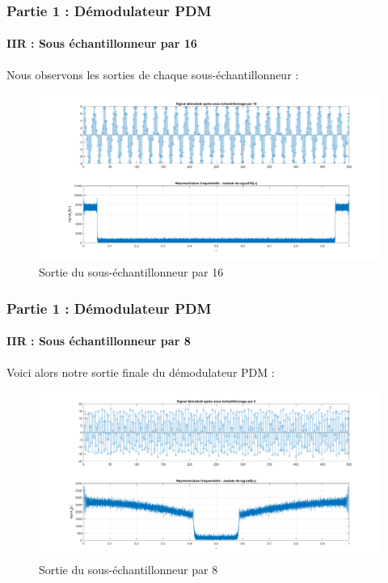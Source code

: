 \documentclass[
10pt,
aspectratio=169,
]{beamer}
\begin{document}
\begin{frame}
\frametitle{Partie 1 : Démodulateur PDM} 
\framesubtitle{IIR : Sous échantillonneur par 16}  
Nous observons les sorties de chaque sous-échantillonneur : 
\begin{figure}[h]
    \centering
    \includegraphics[scale=0.2]{Images/signal16_IIR.png}
    \caption{Sortie du sous-échantillonneur par 16}
\end{figure}
\end{frame}

\begin{frame}
\frametitle{Partie 1 : Démodulateur PDM} 
\framesubtitle{IIR : Sous échantillonneur par 8}  
Voici alors notre sortie finale du démodulateur PDM : 
\begin{figure}[h]
    \centering
    \includegraphics[scale=0.2]{Images/signal8_IIR.png}
    \caption{Sortie du sous-échantillonneur par 8}
\end{figure}
\end{frame}
\end{document}

